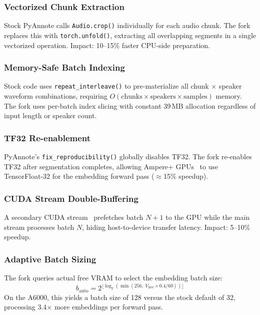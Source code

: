 \documentclass[conference,10pt]{IEEEtran}
\begin{document}
\subsubsection{Vectorized Chunk Extraction}
Stock PyAnnote calls \texttt{Audio.crop()} individually for each audio chunk.
The fork replaces this with \texttt{torch.unfold()}, extracting all overlapping
segments in a single vectorized operation. Impact: 10--15\% faster CPU-side
preparation.

\subsubsection{Memory-Safe Batch Indexing}
Stock code uses \texttt{repeat\_interleave()} to pre-materialize all chunk
$\times$ speaker waveform combinations, requiring
$O(\text{chunks} \times \text{speakers} \times \text{samples})$ memory. The
fork uses per-batch index slicing with constant 39\,MB allocation regardless of
input length or speaker count.

\subsubsection{TF32 Re-enablement}
PyAnnote's \texttt{fix\_reproducibility()} globally disables TF32. The fork
re-enables TF32 after segmentation completes, allowing Ampere+
GPUs~\cite{nvidia2020ampere} to use TensorFloat-32 for the embedding forward
pass ($\approx$15\% speedup).

\subsubsection{CUDA Stream Double-Buffering}
A secondary CUDA stream~\cite{nvidia2024cuda} prefetches batch $N\!+\!1$ to the
GPU while the main stream processes batch $N$, hiding host-to-device transfer
latency. Impact: 5--10\% speedup.

\subsubsection{Adaptive Batch Sizing}
The fork queries actual free VRAM to select the embedding batch size:
\begin{equation}
  b_{\text{auto}} = 2^{\lfloor\log_2(\min(256,\; V_{\text{free}} \times 0.4 / 60))\rfloor}
  \label{eq:adaptivebatch}
\end{equation}
On the A6000, this yields a batch size of 128 versus the stock default of 32,
processing 3.4$\times$ more embeddings per forward pass.
\end{document}
